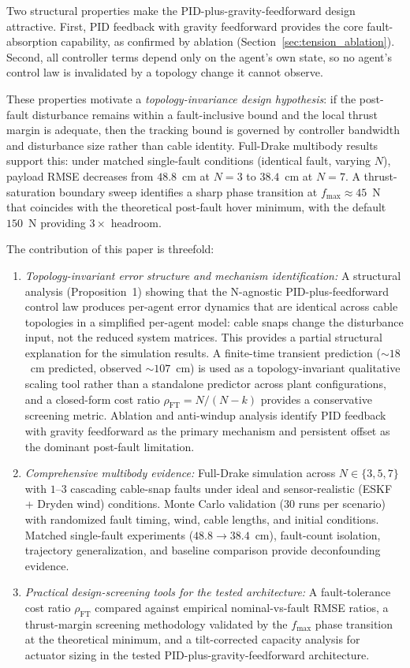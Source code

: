 Two structural properties make the PID-plus-gravity-feedforward design attractive. First, PID feedback with gravity feedforward provides the core fault-absorption capability, as confirmed by ablation (Section~\ref{sec:tension_ablation}). Second, all controller terms depend only on the agent's own state, so no agent's control law is invalidated by a topology change it cannot observe.

These properties motivate a \emph{topology-invariance design hypothesis}: if the post-fault disturbance remains within a fault-inclusive bound and the local thrust margin is adequate, then the tracking bound is governed by controller bandwidth and disturbance size rather than cable identity. Full-Drake multibody results support this: under matched single-fault conditions (identical fault, varying $N$), payload RMSE decreases from $48.8$~cm at $N{=}3$ to $38.4$~cm at $N{=}7$. A thrust-saturation boundary sweep identifies a sharp phase transition at $f_{\max} \approx 45$~N that coincides with the theoretical post-fault hover minimum, with the default $150$~N providing $3\times$ headroom.

The contribution of this paper is threefold:

\begin{enumerate}[label=C\arabic*]
  \item \emph{Topology-invariant error structure and mechanism identification:} A structural analysis (Proposition~1) showing that the N-agnostic PID-plus-feedforward control law produces per-agent error dynamics that are identical across cable topologies in a simplified per-agent model: cable snaps change the disturbance input, not the reduced system matrices. This provides a partial structural explanation for the simulation results. A finite-time transient prediction (${\sim}18$~cm predicted, observed ${\sim}107$~cm) is used as a topology-invariant qualitative scaling tool rather than a standalone predictor across plant configurations, and a closed-form cost ratio $\rho_{\mathrm{FT}} = N/(N{-}k)$ provides a conservative screening metric. Ablation and anti-windup analysis identify PID feedback with gravity feedforward as the primary mechanism and persistent offset as the dominant post-fault limitation.
  \item \emph{Comprehensive multibody evidence:} Full-Drake simulation across $N \in \{3, 5, 7\}$ with $1$--$3$ cascading cable-snap faults under ideal and sensor-realistic (ESKF + Dryden wind) conditions. Monte Carlo validation ($30$ runs per scenario) with randomized fault timing, wind, cable lengths, and initial conditions. Matched single-fault experiments ($48.8 \to 38.4$~cm), fault-count isolation, trajectory generalization, and baseline comparison provide deconfounding evidence.
  \item \emph{Practical design-screening tools for the tested architecture:} A fault-tolerance cost ratio $\rho_{\mathrm{FT}}$ compared against empirical nominal-vs-fault RMSE ratios, a thrust-margin screening methodology validated by the $f_{\max}$ phase transition at the theoretical minimum, and a tilt-corrected capacity analysis for actuator sizing in the tested PID-plus-gravity-feedforward architecture.
\end{enumerate}

